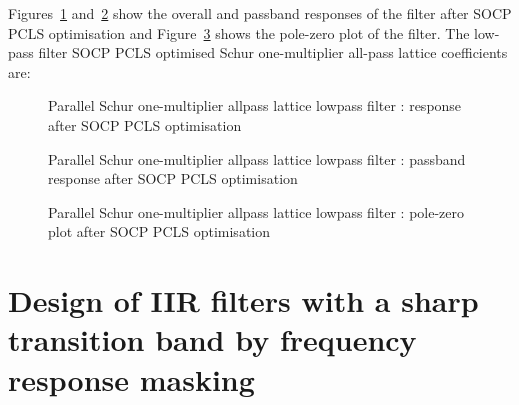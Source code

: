 \documentclass[a4paper,twoside,10pt,english]{report}
\begin{document}
Figures~\ref{fig:Parallel-Schur-one-m-lattice-allpass-lowpass-filter-SOCP-PCLS} 
and~\ref{fig:Parallel-Schur-one-m-lattice-allpass-lowpass-filter-SOCP-PCLS-pass}
show the overall and passband responses of the filter after SOCP PCLS
optimisation and
Figure~\ref{fig:Parallel-Schur-one-m-lattice-allpass-lowpass-filter-SOCP-PCLS-pz}
shows the pole-zero plot of the filter. The low-pass filter SOCP PCLS
optimised Schur one-multiplier all-pass lattice coefficients are:
\begin{small}




\end{small}

\begin{figure}[!htbp]
\begin{center}
\scalebox{0.7}{}
\caption{Parallel Schur one-multiplier allpass lattice lowpass filter : response after SOCP PCLS optimisation}
\label{fig:Parallel-Schur-one-m-lattice-allpass-lowpass-filter-SOCP-PCLS}
\end{center}
\end{figure}
\begin{figure}[!htbp]
\begin{center}
\scalebox{0.7}{}
\caption{Parallel Schur one-multiplier allpass lattice lowpass filter :
  passband response after SOCP PCLS optimisation}
\label{fig:Parallel-Schur-one-m-lattice-allpass-lowpass-filter-SOCP-PCLS-pass}
\end{center}
\end{figure}
\begin{figure}[!htbp]
\begin{center}
\scalebox{0.7}{}
\caption{Parallel Schur one-multiplier allpass lattice lowpass filter :
  pole-zero plot after SOCP PCLS optimisation}
\label{fig:Parallel-Schur-one-m-lattice-allpass-lowpass-filter-SOCP-PCLS-pz}
\end{center}
\end{figure}

\clearpage
\section{\label{sec:Design-of-an-IIR-filters-with-a-sharp-transition-band-by-frequency-response-masking}Design
  of IIR filters with a sharp transition band by frequency response masking}
\end{document}
